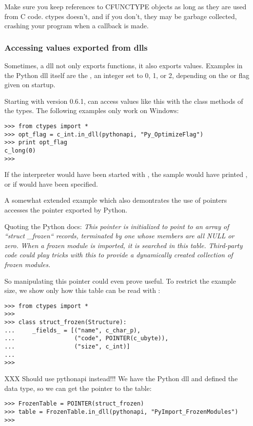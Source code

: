 Make sure you keep references to CFUNCTYPE objects as long as they are
used from C code. ctypes doesn't, and if you don't, they may be
garbage collected, crashing your program when a callback is made.


\subsubsection{Accessing values exported from dlls\label{ctypes-accessing-values-exported-from-dlls}}

Sometimes, a dll not only exports functions, it also exports
values. Examples in the Python dll itself are the ,
an integer set to 0, 1, or 2, depending on the  or  flag
given on startup.

Starting with version 0.6.1,  can access values like this
with the  class methods of the types. The following examples
only work on Windows:
\begin{verbatim}
>>> from ctypes import *
>>> opt_flag = c_int.in_dll(pythonapi, "Py_OptimizeFlag")
>>> print opt_flag
c_long(0)
>>>
\end{verbatim}

If the interpreter would have been started with , the sample
would have printed , or  if  would have
been specified.

A somewhat extended example which also demontrates the use of pointers
accesses the  pointer exported by Python.

Quoting the Python docs: \emph{This pointer is initialized to point to an
array of ``struct {\_}frozen`` records, terminated by one whose members
are all NULL or zero. When a frozen module is imported, it is searched
in this table. Third-party code could play tricks with this to provide
a dynamically created collection of frozen modules.}

So manipulating this pointer could even prove useful. To restrict the
example size, we show only how this table can be read with
:
\begin{verbatim}
>>> from ctypes import *
>>>
>>> class struct_frozen(Structure):
...     _fields_ = [("name", c_char_p),
...                 ("code", POINTER(c_ubyte)),
...                 ("size", c_int)]
...
>>>
\end{verbatim}

XXX Should use pythonapi instead!!!
We have  the Python dll and defined the 
data type, so we can get the pointer to the table:
\begin{verbatim}
>>> FrozenTable = POINTER(struct_frozen)
>>> table = FrozenTable.in_dll(pythonapi, "PyImport_FrozenModules")
>>>
\end{verbatim}

